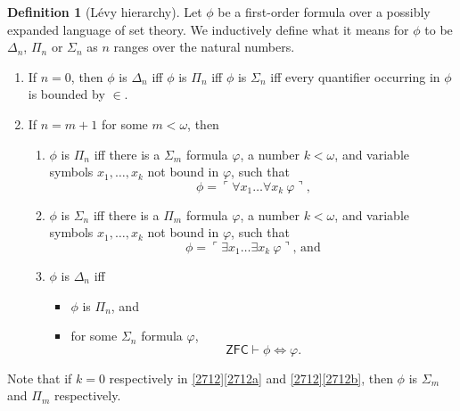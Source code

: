 \documentclass[12pt, twoside]{memoir}
\numberwithin{equation}{section}
\theoremstyle{definition}
\newtheorem{defi}[thm]{Definition}
\theoremstyle{remark}
\theoremstyle{definition}
\theoremstyle{definition}
\theoremstyle{definition}
\theoremstyle{remark}
\begin{document}
\begin{defi}[L\'{e}vy hierarchy]\label{def27}
Let $\phi$ be a first-order formula over a possibly expanded language of set theory. We inductively define what it means for $\phi$ to be $\Delta_n$, $\Pi_n$ or $\Sigma_n$ as $n$ ranges over the natural numbers.
\begin{enumerate}[label=(\arabic*)]
    \item\label{def271} If $n = 0$, then $\phi$ is $\Delta_n$ iff $\phi$ is $\Pi_n$ iff $\phi$ is $\Sigma_n$ iff every quantifier occurring in $\phi$ is bounded by $\in$.
    \item\label{2712} If $n = m + 1$ for some $m < \omega$, then 
    \begin{enumerate}[label=(\alph*)]
        \item\label{2712a} $\phi$ is $\Pi_n$ iff there is a $\Sigma_m$ formula $\varphi$, a number $k < \omega$, and variable symbols $x_1, \dots, x_k$ not bound in $\varphi$, such that 
        \begin{equation*}
            \phi = \ulcorner \forall x_1 \dots \forall x_k \ \varphi \urcorner \text{,}
        \end{equation*}
        \item\label{2712b} $\phi$ is $\Sigma_n$ iff there is a $\Pi_m$ formula $\varphi$, a number $k < \omega$, and variable symbols $x_1, \dots, x_k$ not bound in $\varphi$, such that 
        \begin{equation*}
            \phi = \ulcorner \exists x_1 \dots \exists x_k \ \varphi \urcorner \text{, and}
        \end{equation*}
        \item $\phi$ is $\Delta_n$ iff 
        \begin{itemize}[label=$\circ$]
            \item $\phi$ is $\Pi_n$, and
            \item for some $\Sigma_n$ formula $\varphi$,
            \begin{equation*}
                \mathsf{ZFC} \vdash \phi \iff \varphi \text{.}
            \end{equation*}
        \end{itemize}
    \end{enumerate}
\end{enumerate}
Note that if $k = 0$ respectively in \ref{2712}\ref{2712a} and \ref{2712}\ref{2712b}, then $\phi$ is $\Sigma_m$ and $\Pi_m$ respectively.
\end{defi}
\end{document}
